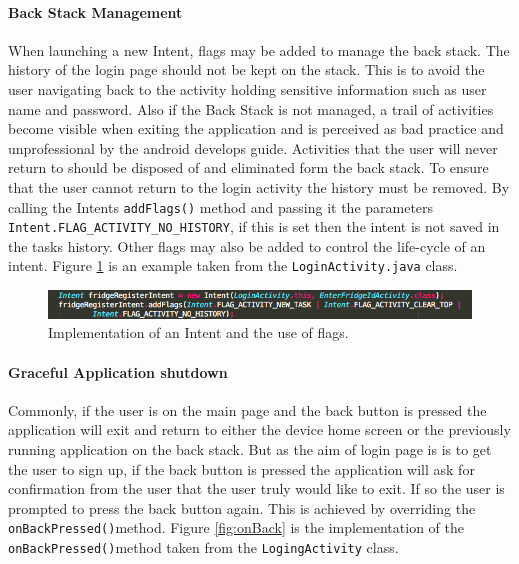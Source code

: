 \documentclass[a4paper, 11pt]{article}
\begin{document}
\paragraph{Back Stack Management}
When launching a new Intent, flags may be added to manage the back stack. The history of the login page should not be kept on the stack. This is to avoid the user navigating back to the activity holding sensitive information such as user name and password. Also if the Back Stack is not managed, a trail of activities become visible when exiting the application and is perceived as bad practice and unprofessional by the android develops guide.\cite{android} Activities that the user will never return to should be disposed of and eliminated form the back stack. To ensure that the user cannot return to the login activity the history must be removed. By calling the Intents \texttt{addFlags()} method and passing it the parameters \texttt{Intent.FLAG\_ACTIVITY\_NO\_HISTORY}, if this is set then the intent is not saved in the tasks history. Other flags may also be added to control the life-cycle of an intent. Figure \ref{fig:intent} is an example taken from the \texttt{LoginActivity.java} class. 

\vspace{\baselineskip}

\begin{figure}[h]
\centering
\includegraphics[width=\textwidth]{intent}
\caption{Implementation of an Intent and the use of flags.} \label{fig:intent}
\end{figure}

\vspace{\baselineskip}


\paragraph{Graceful Application shutdown}
Commonly, if the user is on the main page and the back button is pressed the application will exit and return to either the device home screen or the previously running application on the back stack. But as the aim of login page is is to get the user to sign up, if the back button is pressed the application will ask for confirmation from the user that the user truly would like to exit. If so the user is prompted to press the back button again. This is achieved by overriding the \texttt{onBackPressed()}method. Figure \ref{fig:onBack} is the implementation of the  \texttt{onBackPressed()}method taken from the  \texttt{LogingActivity} class.
\end{document}
